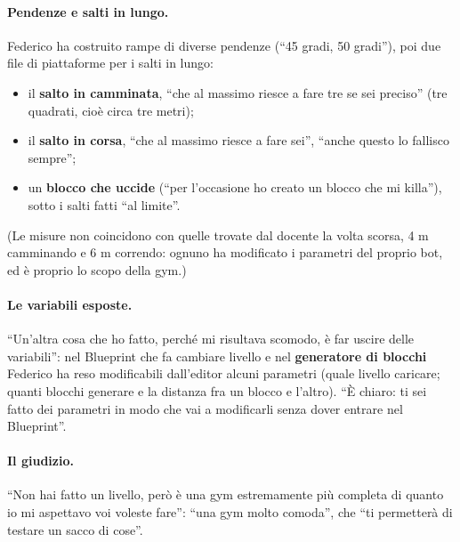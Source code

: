 \paragraph{Pendenze e salti in lungo.} Federico ha costruito rampe di diverse pendenze
(``45 gradi, 50 gradi''), poi due file di piattaforme per i salti in lungo:
\begin{itemize}
  \item il \textbf{salto in camminata}, ``che al massimo riesce a fare tre se sei preciso''
        (tre quadrati, cioè circa tre metri);
  \item il \textbf{salto in corsa}, ``che al massimo riesce a fare sei'', ``anche questo lo
        fallisco sempre'';
  \item un \textbf{blocco che uccide} (``per l'occasione ho creato un blocco che mi
        killa''), sotto i salti fatti ``al limite''.
\end{itemize}
(Le misure non coincidono con quelle trovate dal docente la volta scorsa, 4 m camminando e
6 m correndo: ognuno ha modificato i parametri del proprio bot, ed è proprio lo scopo della
gym.)

\paragraph{Le variabili esposte.} ``Un'altra cosa che ho fatto, perché mi risultava scomodo,
è far uscire delle variabili'': nel Blueprint che fa cambiare livello e nel
\textbf{generatore di blocchi} Federico ha reso modificabili dall'editor alcuni parametri
(quale livello caricare; quanti blocchi generare e la distanza fra un blocco e l'altro).
``È chiaro: ti sei fatto dei parametri in modo che vai a modificarli senza dover entrare nel
Blueprint''.

\paragraph{Il giudizio.} ``Non hai fatto un livello, però è una gym estremamente più
completa di quanto io mi aspettavo voi voleste fare'': ``una gym molto comoda'', che
``ti permetterà di testare un sacco di cose''.

